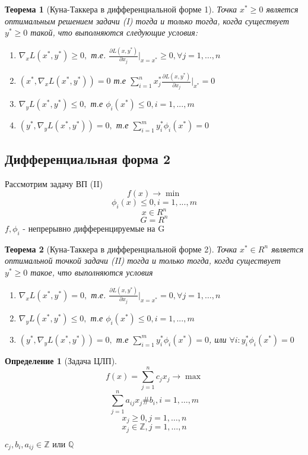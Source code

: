 \documentclass[a4paper]{article}
\newtheorem{theorem}{Теорема}[section]
\theoremstyle{definition}
\newtheorem*{definition}{Определение}
\theoremstyle{remark}
\begin{document}
\begin{theorem}[Куна-Таккера в дифференциальной форме 1]
    Точка $x^* \ge 0$ является оптимальным решением задачи (I) тогда  и только тогда, когда существует $y^*\ge 0$ такой, что выполняются следующие условия:
    \begin{enumerate}
        \item $\nabla_x L(x^*, y^*) \ge 0,$ т.е. $\frac{\partial L(x, y^*)}{\partial x_j} |_{x = x^*} \ge 0, \forall j = 1, \dots, n$
        \item $(x^*, \nabla_x L(x^*, y^*)) = 0$ т.е $\sum_{i = 1}^n x^*_j\frac{\partial L(x, y^*)}{\partial x_j}|_{x^*} = 0$
        \item $\nabla_y L(x^*, y^*) \le 0,$ т.е $\phi_i(x^*)\le 0, i = 1, ..., m$
        \item $(y^*, \nabla_y L(x^*, y^*)) = 0, $ т.е $\sum_{i = 1}^{m}y^*_i \phi_i(x^*) = 0$
    \end{enumerate}
\end{theorem}
\subsection*{Дифференциальная форма 2}
Рассмотрим задачу ВП (II)
\[f(x)\to \min\]
\[\phi_i(x)\le 0, i = 1, ..., m\]
\[x\in R^n\]
\[G = R^n\]
$f, \phi_i$ - непрерывно дифференцируемые на G
\begin{theorem}[Куна-Таккера в дифференциальной форме 2]
    Точка $x^*\in R^n$ является оптимальной точкой задачи (II)
    тогда и только тогда, когда существует $y^*\ge 0$ такое, что выполняются условия
    \begin{enumerate}
        \item $\nabla_x L(x^*, y^*) = 0,$ т.е.
        $\frac{\partial L(x, y^*)}{\partial x_j} |_{x = x^*} = 0, \forall j = 1, \dots, n$
        \item $\nabla_y L(x^*, y^*) \le 0,$ т.е $\phi_i(x^*)\le 0, i = 1, ..., m$
        \item $(y^*, \nabla_y L(x^*, y^*)) = 0, $ т.е $\sum_{i = 1}^{m}y^*_i \phi_i(x^*) = 0$, или $\forall i: y^*_i \phi_i(x^*) = 0$
    \end{enumerate}
\end{theorem}
\begin{definition}[Задача ЦЛП]
	\begin{equation}
		f(x) = \sum_{j=1}^n c_j x_j \to \max
	\end{equation}
	\begin{equation}
		\sum_{j = 1}^n a_{ij}x_j \# b_i, i = 1, \dots, m
	\end{equation}
	\begin{equation}
		x_j \ge 0, j = 1, \dots, n
	\end{equation}
	\begin{equation}
		x_j \in \mathbb{Z}, j =1, \dots, n
	\end{equation}

	\(c_j, b_i, a_{ij} \in \mathbb{Z} \text{ или } \mathbb{Q}\)
\end{definition}
\end{document}
